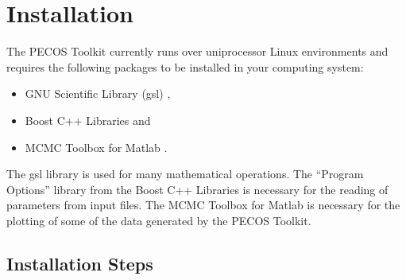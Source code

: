 \chapter{Installation}\label{ch-install}
\thispagestyle{headings}

The PECOS Toolkit currently runs over uniprocessor Linux environments and requires the following packages to be installed in your computing system:
\begin{itemize}
\item GNU Scientific Library (gsl) \cite{gsl},
\item Boost C++ Libraries \cite{boost} and
\item MCMC Toolbox for Matlab \cite{mcmctool}.
\end{itemize}
The gsl library is used for many mathematical operations.
The ``Program Options'' library from the Boost C++ Libraries is necessary for the reading of parameters from input files.
The MCMC Toolbox for Matlab is necessary for the plotting of some of the data generated by the PECOS Toolkit.

\section{Installation Steps}


